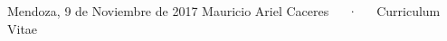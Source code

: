 \documentclass[11pt, a4paper]{awesome-cv}
\begin{document}

\makecvheader

\makecvfooter
   {Mendoza, 9 de Noviembre de 2017}
  {Mauricio Ariel Caceres~~~·~~~Curriculum Vitae}
  {\thepage}
	






%
%
%


\end{document}
